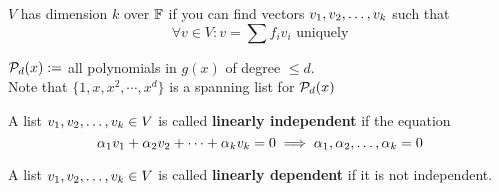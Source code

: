 \begin{definition}
    $V$ has dimension $k$ over $\mathbb F$ if you can find vectors ${v}_1,{v}_2, \ldots, {v}_{k}$ such that
    \[\forall v \in V : v = \sum f_iv_i \text{ uniquely}\]
\end{definition}
\begin{definition}
    $\mathcal P_d(x) : =$ all polynomials in $g(x)$ of degree $\leq d$. \\ Note that $\{ 1, x, x^2, \cdots, x^d\}$ is a spanning list for $\mathcal P_d(x)$
\end{definition}
\begin{definition}
    A list ${v}_1,{v}_2, \ldots, {v}_{k} \in V$ is called \textbf{linearly independent} if the equation
    \[ \alpha_1 v_1 + \alpha_2 v_2 + \cdots + \alpha_k v_k = 0 \implies {\alpha}_1,{\alpha}_2, \ldots, {\alpha}_{k} = 0\]
\end{definition}
\begin{definition}
    A list ${v}_1,{v}_2, \ldots, {v}_{k} \in V$ is called \textbf{linearly dependent} if it is not independent.
\end{definition}
